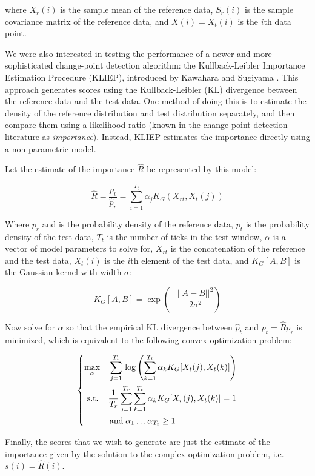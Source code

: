 where $\bar{X}_r(i)$ is the sample mean of the reference data, $S_r(i)$
is the sample covariance matrix of the reference data, and $X(i)=X_t(i)$ is
the $i$th data point.

We were also interested in testing the performance of a newer and more
sophisticated change-point detection algorithm: the
Kullback-Leibler Importance Estimation Procedure (KLIEP),
introduced by Kawahara and Sugiyama \cite{sugiyama09} \cite{sugiyama08}.
This approach generates scores using the Kullback-Leibler (KL)
divergence between the reference data and the test data. One method of doing this
is to estimate the density of the reference distribution and test distribution
separately, and then compare them using a likelihood ratio
(known in the change-point detection literature as \emph{importance}). 
Instead, KLIEP estimates the importance directly using a non-parametric model.

Let the estimate of the importance $\hat{R}$ be represented by this model:

\[
\hat{R} = \frac{p_t}{\hat{p}_r} = \sum_{i=1}^{T_t} \alpha_j K_G(X_{rt},X_t(j))
\]

Where $p_r$ and is the probability density of the reference data,
$p_t$ is the probability density of the test
data, $T_t$ is the number of ticks in the test window, $\alpha$ is a
vector of model parameters to solve for, $X_{rt}$ is the concatenation of the reference and the
test data, $X_t(i)$ is the $i$th element of the test data,
and $K_G[A,B]$ is the Gaussian kernel with width $\sigma$:

\[
K_G[A,B] = \exp \left(-\frac{||A-B||^2}{2\sigma^2}\right)
\]

Now solve for $\alpha$ so that the empirical KL divergence between $\hat{p}_t$ and
$p_t = \hat{R}p_r$ is minimized, which is equivalent to the following convex optimization
problem:

\[
\begin{dcases}
 \max_{\alpha} \quad \sum_{j=1}^{T_t} \, \log \left( \sum_{k=1}^{T_t} \alpha_k K_G[X_t(j), X_t(k)] \right) \\
 \,\, \text{s.t.} \quad\, \frac{1}{T_r} \sum_{j=1}^{T_r} \sum_{k=1}^{T_t} \alpha_k K_G[X_r(j),X_t(k)] = 1 \\
 \qquad \quad \text{and} \; \alpha_1 \ldots \alpha_{T_t} \ge 1
\end{dcases}
\]

Finally, the scores that we wish to generate are just the estimate of the importance given by the
solution to the complex optimization problem, i.e. $s(i) = \hat{R}(i)$.

